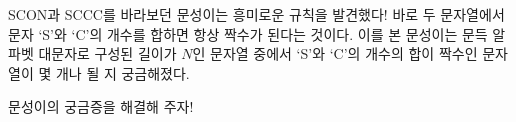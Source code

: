 SCON과 SCCC를 바라보던 문성이는 흥미로운 규칙을 발견했다! 바로 두 문자열에서 문자 `S'와 `C'의 개수를 합하면 항상 짝수가 된다는 것이다. 이를 본 문성이는 문득 알파벳 대문자로 구성된 길이가 $N$인 문자열 중에서 `S'와 `C'의 개수의 합이 짝수인 문자열이 몇 개나 될 지 궁금해졌다.

문성이의 궁금증을 해결해 주자!